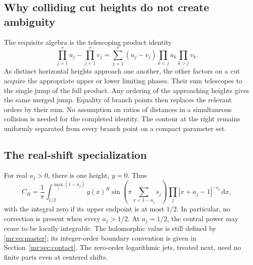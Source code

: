 \documentclass[11pt,letterpaper]{article}
\theoremstyle{definition}\newtheorem{definition}[theorem]{Definition}
\theoremstyle{remark}\newtheorem{remark}[theorem]{Remark}
\newcommand{\dd}{\,\mathrm d}\newcommand{\M}{\mathcal M}
\begin{document}
\subsection{Why colliding cut heights do not create ambiguity}
The requisite algebra is the telescoping product identity
\begin{equation}\label{mr:eq:telescope}
 \prod_{j=1}^r u_j-\prod_{j=1}^r v_j
 =\sum_{j=1}^r (u_j-v_j)
       \prod_{k<j}u_k\prod_{k>j}v_k.
\end{equation}
As distinct horizontal heights approach one another, the other factors
on a cut acquire the appropriate upper or lower limiting phases.
Their sum telescopes to the single jump of the full product. Any ordering
of the approaching heights gives the same merged jump. Equality of
branch points then replaces the relevant orders by their sum.
No assumption on ratios of distances in a simultaneous collision is
needed for the completed identity. The contour at the right remains
uniformly separated from every branch point on a compact parameter set.

\subsection{The real-shift specialization}
For real $a_j>0$, there is one height, $y=0$. Thus
\begin{equation}\label{mr:eq:realcut}
 C_R=\frac1\pi\int_{1/2}^{\max_j(1-a_j)}
 g(x)^R\sin\left(\pi\sum_{x<1-a_j}s_j\right)
 \prod_j|x+a_j-1|^{-s_j}\dd x,
\end{equation}
with the integral zero if its upper endpoint is at most $1/2$.
In particular, no correction is present when every $a_j>1/2$.
At $a_j=1/2$, the central power may cease to be locally integrable.
The holomorphic value is still defined by \eqref{mr:eq:master}; its
integer-order boundary convention is given in Section~\ref{mr:sec:contact}.
The zero-order logarithmic jets, treated next, need no finite parts even
at centered shifts.
\end{document}
